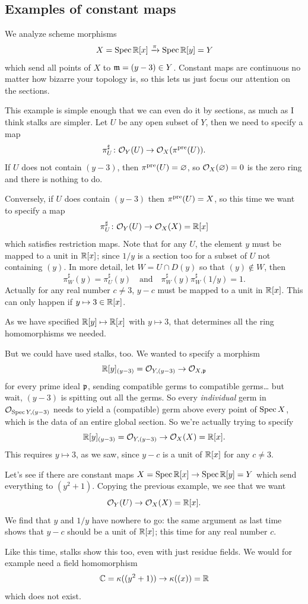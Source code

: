 \subsection{Examples of constant maps}
\begin{example}
	We analyze scheme morphisms
	\[ X = \operatorname{Spec} \mathbb R[x] \xrightarrow{\pi} \operatorname{Spec} \mathbb R[y] = Y \]
	which send all points of $X$ to $\mathfrak m = (y-3) \in Y$.
	Constant maps are continuous no matter how bizarre your topology is,
	so this lets us just focus our attention on the sections.

	This example is simple enough that we can even do it by sections,
	as much as I think stalks are simpler.
	Let $U$ be any open subset of $Y$, then we need to specify a map
	\[ \pi^\sharp_U \colon \mathcal O_Y(U) \to \mathcal O_X(\pi^{\text{pre}}(U)). \]
	If $U$ does not contain $(y-3)$, then $\pi^{\text{pre}}(U) = \varnothing$,
	so $\mathcal O_X(\varnothing) = 0$ is the zero ring and there is nothing to do.

	Conversely, if $U$ does contain $(y-3)$ then $\pi^{\text{pre}}(U) = X$,
	so this time we want to specify a map
	\[ \pi^\sharp_U \colon \mathcal O_Y(U) \to \mathcal O_X(X) = \mathbb R[x] \]
	which satisfies restriction maps.
	Note that for any $U$, the element $y$ must be mapped to a unit in $\mathbb R[x]$;
	since $1/y$ is a section too for a subset of $U$ not containing $(y)$.
	In more detail, let $W = U \cap D(y)$ so that $(y) \notin W$, then
	\[
		\pi^\sharp_W(y) = \pi^\sharp_U(y) \quad \text{and} \quad
		\pi^\sharp_W(y) \pi^\sharp_W(1/y) = 1.
	\]
	Actually for any real number $c \neq 3$,
	$y-c$ must be mapped to a unit in $\mathbb R[x]$.
	This can only happen if $y \mapsto 3 \in \mathbb R[x]$.

	As we have specified $\mathbb R[y] \mapsto \mathbb R[x]$ with $y \mapsto 3$,
	that determines all the ring homomorphisms we needed.
\end{example}
But we could have used stalks, too.
We wanted to specify a morphism
\[ \mathbb R[y]_{(y-3)} = \mathcal O_{Y, (y-3)} \to \mathcal O_{X, \mathfrak p} \]
for every prime ideal $\mathfrak p$,
sending compatible germs to compatible germs\dots
but wait, $(y-3)$ is spitting out all the germs.
So every \emph{individual} germ in $\mathcal O_{\operatorname{Spec} Y, (y-3)}$
needs to yield a (compatible) germ above every point of $\operatorname{Spec} X$,
which is the data of an entire global section.
So we're actually trying to specify
\[ \mathbb R[y]_{(y-3)} = \mathcal O_{Y, (y-3)} \to \mathcal O_{X}(X) = \mathbb R[x]. \]
This requires $y \mapsto 3$, as we saw,
since $y-c$ is a unit of $\mathbb R[x]$ for any $c \neq 3$.

\begin{example}
	Let's see if there are constant maps
	$X = \operatorname{Spec} \mathbb R[x] \to \operatorname{Spec} \mathbb R[y] = Y$
	which send everything to $(y^2+1)$.
	Copying the previous example, we see that we want
	\[ \mathcal O_Y(U) \to \mathcal O_X(X) = \mathbb R[x]. \]
	We find that $y$ and $1/y$ have nowhere to go:
	the same argument as last time shows that $y-c$ should be a unit of $\mathbb R[x]$;
	this time for any real number $c$.

	Like this time, stalks show this too,
	even with just residue fields.
	We would for example need a field homomorphism
	\[ \mathbb C = \kappa( (y^2+1) ) \to \kappa( (x) ) = \mathbb R \]
	which does not exist.
\end{example}

